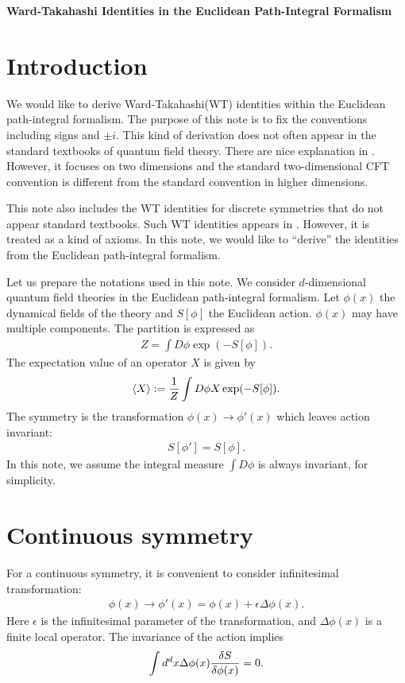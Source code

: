 \documentclass[12pt]{scrartcl}
\begin{document}
\begin{center}
{\bfseries \sffamily \LARGE Ward-Takahashi Identities in the Euclidean Path-Integral Formalism}  \\

\vspace{0.5cm}
\end{center}

\section{Introduction}
We would like to derive Ward-Takahashi(WT) identities within the Euclidean path-integral formalism. The purpose of this note is to fix the conventions including signs and $\pm i$.  This kind of derivation does not often appear in the standard textbooks of quantum field theory.  There are nice explanation in \cite{Polchinski:1998rq}. However, it focuses on two dimensions and the standard two-dimensional CFT convention is different from the standard convention in higher dimensions.

This note also includes the WT identities for discrete symmetries that do not appear standard textbooks.  Such WT identities appears in \cite{Gaiotto:2014kfa}.  However, it is treated as a kind of axioms.  In this note, we would like to ``derive'' the identities from the Euclidean path-integral formalism.

Let us prepare the notations used in this note.  We consider $d$-dimensional quantum field theories in the Euclidean path-integral formalism.
Let $\phi(x)$ the dynamical fields of the theory and $S[\phi]$ the Euclidean action. $\phi(x)$ may have multiple components.  The partition is expressed as
\begin{align}
    Z=\int D\phi \exp(-S[\phi]).
\end{align}
The expectation value of an operator $X$ is given by
\begin{align}
    \expval{X}:=\frac{1}{Z}\int D\phi X \exp(-S[\phi]).
\end{align}
The symmetry is the transformation $\phi(x)\to \phi'(x)$ which leaves action invariant:
\begin{align}
    S[\phi']=S[\phi].
\end{align}
In this note, we assume the integral measure $\int D\phi $ is always invariant, for simplicity.

\section{Continuous symmetry}
For a continuous symmetry, it is convenient to consider infinitesimal transformation:
\begin{align}
    \phi(x)\to \phi'(x)=\phi(x)+\epsilon \Delta \phi(x).
\end{align}
Here $\epsilon$ is the infinitesimal parameter of the transformation, and $\Delta \phi(x)$ is a finite local operator.
The invariance of the action implies
\begin{align}
    \int d^dx\Delta \phi(x)\fdv{S}{\phi(x)}=0.
\end{align}
\end{document}
